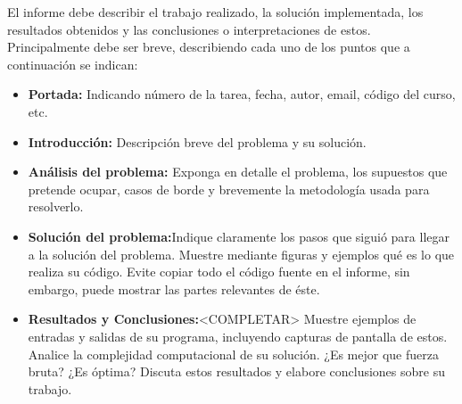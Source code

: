 \documentclass[dcc]{fcfmcourse}
\begin{document}
El informe debe describir el trabajo realizado, la solución implementada, los resultados obtenidos
y las conclusiones o interpretaciones de estos. Principalmente debe ser breve, describiendo cada uno
de los puntos que a continuación se indican:

\begin{itemize}
    \item \textbf{Portada:} Indicando número de la tarea, fecha, autor, email, código del curso, etc.
    \item \textbf{Introducción:} Descripción breve del problema y su solución.
    \item \textbf{Análisis del problema:} Exponga en detalle el problema, los supuestos que pretende ocupar, casos de borde y brevemente la metodología usada para resolverlo.
    \item \textbf{Solución del problema:}Indique claramente los pasos que siguió para llegar a la solución
del problema. Muestre mediante figuras y ejemplos qué es lo que realiza su código. Evite
copiar todo el código fuente en el informe, sin embargo, puede mostrar las partes relevantes
de éste.
\item \textbf{Resultados y Conclusiones:}<COMPLETAR> Muestre ejemplos de entradas y salidas de su programa, incluyendo
capturas de pantalla de estos. Analice la complejidad computacional de su solución.
¿Es mejor que fuerza bruta? ¿Es óptima? Discuta estos resultados y elabore conclusiones
sobre su trabajo.
\end{itemize}
\end{document}
